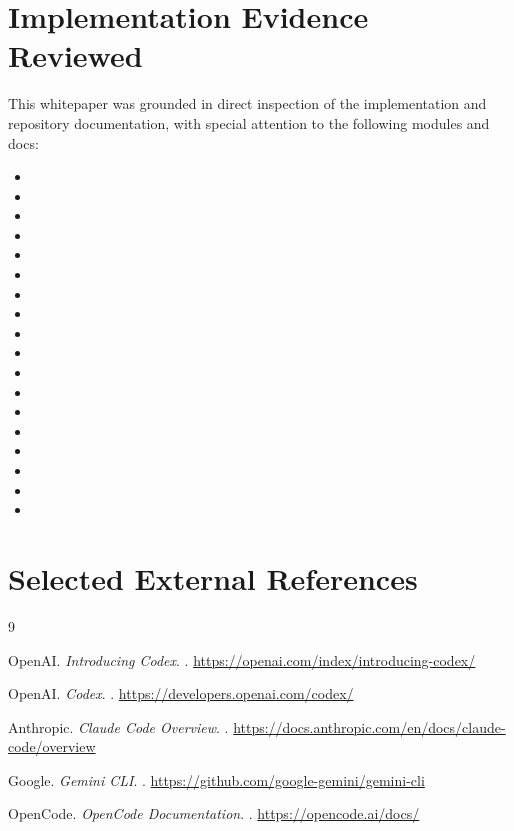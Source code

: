 \documentclass[11pt,a4paper]{article}
\begin{document}
\appendix

\section{Implementation Evidence Reviewed}
This whitepaper was grounded in direct inspection of the implementation and repository documentation, with special attention to the following modules and docs:
\begin{itemize}
    \item {}
    \item {}
    \item {}
    \item {}
    \item {}
    \item {}
    \item {}
    \item {}
    \item {}
    \item {}
    \item {}
    \item {}
    \item {}
    \item {}
    \item {}
    \item {}
    \item {}
    \item {}
\end{itemize}

\section{Selected External References}
\begin{thebibliography}{9}

OpenAI.
\newblock \emph{Introducing Codex}.
.
\newblock \url{https://openai.com/index/introducing-codex/}

OpenAI.
\newblock \emph{Codex}.
.
\newblock \url{https://developers.openai.com/codex/}

Anthropic.
\newblock \emph{Claude Code Overview}.
.
\newblock \url{https://docs.anthropic.com/en/docs/claude-code/overview}

Google.
\newblock \emph{Gemini CLI}.
.
\newblock \url{https://github.com/google-gemini/gemini-cli}

OpenCode.
\newblock \emph{OpenCode Documentation}.
.
\newblock \url{https://opencode.ai/docs/}

\end{thebibliography}
\end{document}
